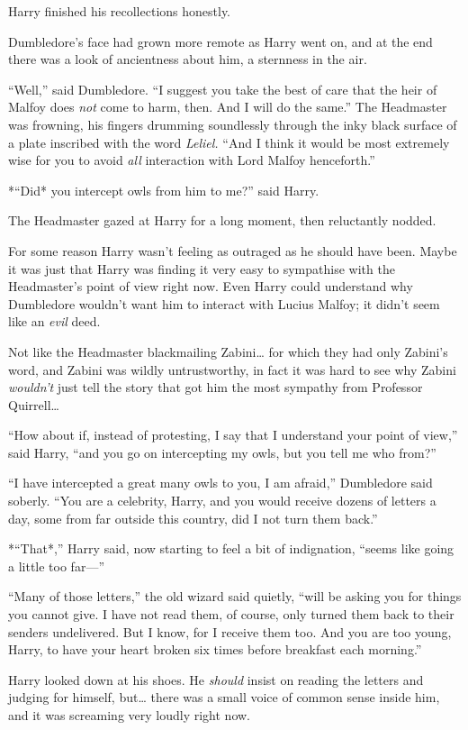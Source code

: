 Harry finished his recollections honestly.

Dumbledore's face had grown more remote as Harry went on, and at the end
there was a look of ancientness about him, a sternness in the air.

``Well,'' said Dumbledore. ``I suggest you take the best of care that
the heir of Malfoy does \emph{not} come to harm, then. And I will do the
same.'' The Headmaster was frowning, his fingers drumming soundlessly
through the inky black surface of a plate inscribed with the word
\emph{Leliel.} ``And I think it would be most extremely wise for you to
avoid \emph{all} interaction with Lord Malfoy henceforth.''

*``Did* you intercept owls from him to me?'' said Harry.

The Headmaster gazed at Harry for a long moment, then reluctantly
nodded.

For some reason Harry wasn't feeling as outraged as he should have been.
Maybe it was just that Harry was finding it very easy to sympathise with
the Headmaster's point of view right now. Even Harry could understand
why Dumbledore wouldn't want him to interact with Lucius Malfoy; it
didn't seem like an \emph{evil} deed.

Not like the Headmaster blackmailing Zabini\ldots{} for which they had
only Zabini's word, and Zabini was wildly untrustworthy, in fact it was
hard to see why Zabini \emph{wouldn't} just tell the story that got him
the most sympathy from Professor Quirrell\ldots{}

``How about if, instead of protesting, I say that I understand your
point of view,'' said Harry, ``and you go on intercepting my owls, but
you tell me who from?''

``I have intercepted a great many owls to you, I am afraid,'' Dumbledore
said soberly. ``You are a celebrity, Harry, and you would receive dozens
of letters a day, some from far outside this country, did I not turn
them back.''

*``That*,'' Harry said, now starting to feel a bit of indignation,
``seems like going a little too far---''

``Many of those letters,'' the old wizard said quietly, ``will be asking
you for things you cannot give. I have not read them, of course, only
turned them back to their senders undelivered. But I know, for I receive
them too. And you are too young, Harry, to have your heart broken six
times before breakfast each morning.''

Harry looked down at his shoes. He \emph{should} insist on reading the
letters and judging for himself, but\ldots{} there was a small voice of
common sense inside him, and it was screaming very loudly right now.

